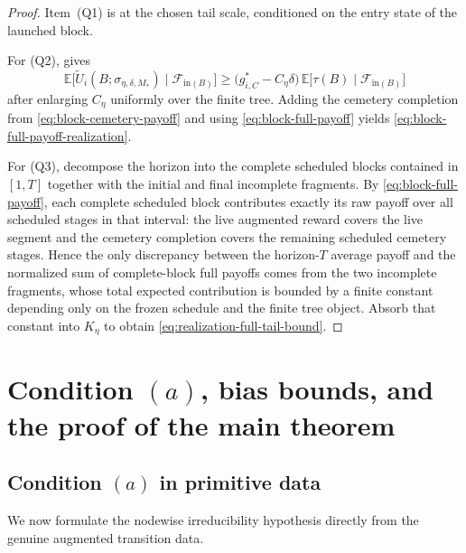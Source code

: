 \documentclass[12pt]{article}
\theoremstyle{definition}
\newcommand{\E}{\mathbb{E}}
\newcommand{\1}{\mathbf{1}}
\newcommand{\cF}{\mathcal{F}}
\begin{document}
\begin{proof}
Item~(Q1) is  at the chosen tail scale, conditioned on
the entry state of the launched block.

For (Q2),  gives
\[
\E\bigl[\widetilde U_i(B;\sigma_{\eta,\delta,M_*})\mid \cF_{\mathrm{in}(B)}\bigr]
\ge
\bigl(g_{i,C}^*-C_\eta\delta\bigr)\,\E\bigl[\tau(B)\mid \cF_{\mathrm{in}(B)}\bigr]
\]
after enlarging $C_\eta$ uniformly over the finite tree. Adding the cemetery
completion from \eqref{eq:block-cemetery-payoff} and using
\eqref{eq:block-full-payoff} yields
\eqref{eq:block-full-payoff-realization}.

For (Q3), decompose the horizon into the complete scheduled blocks contained in
$[1,T]$ together with the initial and final incomplete fragments. By
\eqref{eq:block-full-payoff}, each complete scheduled block contributes exactly
its raw payoff over all scheduled stages in that interval: the live augmented
reward covers the live segment and the cemetery completion covers the remaining
scheduled cemetery stages. Hence the only discrepancy between the horizon-$T$
average payoff and the normalized sum of complete-block full payoffs comes from
the two incomplete fragments, whose total expected contribution is bounded by a
finite constant depending only on the frozen schedule and the finite tree object.
Absorb that constant into $K_\eta$ to obtain
\eqref{eq:realization-full-tail-bound}.
\end{proof}

\section{Condition \texorpdfstring{$(a)$}{(a)}, bias bounds, and the proof of the main theorem}
\label{sec:proof-main}

\subsection{Condition \texorpdfstring{$(a)$}{(a)} in primitive data}

We now formulate the nodewise irreducibility hypothesis directly from the genuine
augmented transition data.
\end{document}
